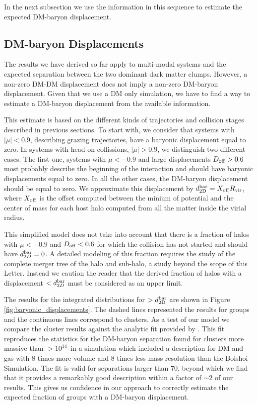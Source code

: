 \documentclass{emulateapj}
\newcommand{\hkpc}{{\ifmmode{h^{-1}{\rm kpc}}\else{$h^{-1}$kpc }\fi}}
\newcommand{\hMsun}{{\ifmmode{h^{-1}{\rm {M_{\odot}}}}\else{$h^{-1}{\rm{M_{\odot}}}$}\fi}}
\begin{document}
In the next subsection we use the information in this sequence to
estimate the expected DM-baryon displacement. 



\subsection{DM-baryon Displacements}
\label{sec:baryonic_displacements}

The results we have derived so far apply to multi-modal systems and
the expected separation between the two dominant dark matter
clumps. However, a non-zero DM-DM displacement does not imply 
a non-zero DM-baryon displacement. Given that we use a DM only
simulation, we have to find a way to estimate a DM-baryon displacement
from the available information.  

This estimate is based on the different kinds of trajectories and
collision stages described in previous sections. To start with, we
consider that systems with $|\mu|<0.9$, describing grazing
trajectories, have a baryonic displacement equal to zero.  In systems
with head-on collissions, $|\mu|>0.9$, we distinguish two different
cases. The first one, systems with  $\mu<-0.9$ and large displacements $D_{\rm
  off}>0.6$ most probably describe the beginning of the interaction
and should have baryonic displacements equal to zero.
In all the other cases, the DM-baryon displacement
should be equal to zero. We approximate this displacement by  $d_{\rm
  2D}^{\rm bar} = X_{\rm off} R_{\rm   vir}$, where $X_{\rm   off}$ is
the offset computed between the minium of potential and the center of
mass for each host halo computed from all the matter inside the virial
radius.  


This simplified model does not take into account that there is a
fraction of halos with $\mu<-0.9$ and $D_{\rm off}<0.6$ for which the
collision has not started and should have $d_{2D}^{\rm bar}=0$. A detailed
modeling of this fraction requires the study of the complete merger
tree of the halo and sub-halo, a study beyond the scope of this
Letter. Instead we caution the reader that the derived fraction of
halos with a displacement $<d_{2D}^{\rm bar}$ must be considered as an
upper limit. 

The results for the integrated distributions for $>d_{\rm 2D}^{\rm bar}$
are shown in Figure \ref{fig:baryonic_displacements}. The dashed lines
represented the results for groups and the continuous lines correspond
to clusters. As a test of our model we compare the cluster results
against the analytic fit provided by \cite{ForeroRomero2010}. This fit
reproduces the statistics for the DM-baryon separation found for
clusters more massive than $>10^{14}$\hMsun\ in a simulation
which included a description for DM and gas with $8$ times more volume
and $8$ times less mass resolution than the Bolshoi Simulation. The
fit is valid for separations larger than $70$\hkpc, beyond which we
find that it provides a remarkably good description within a factor of
$\sim 2$ of our results. This gives us confidence in our approach to
correctly estimate the expected fraction of groups with a DM-baryon
displacement. 
\end{document}
